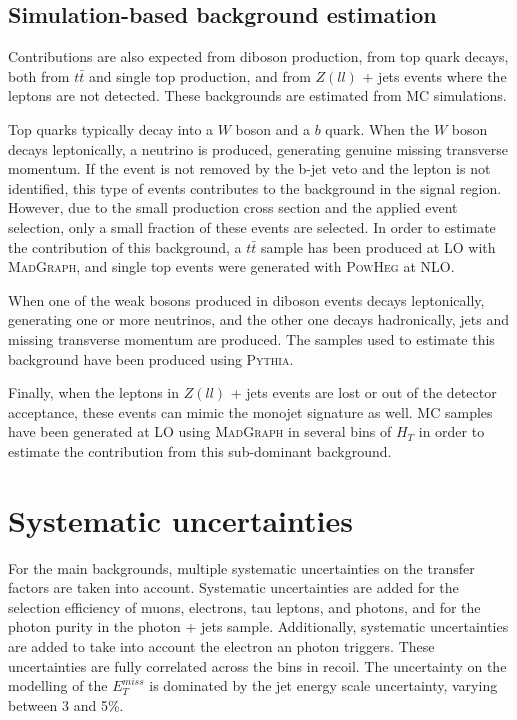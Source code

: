 \subsection{Simulation-based background estimation}

Contributions are also expected from diboson production, from top quark decays, both from $t\bar{t}$ and single top production, and from $Z(ll)$ + jets events where the leptons are not detected. These backgrounds are estimated from MC simulations. 

Top quarks typically decay into a $W$ boson and a $b$ quark. When the $W$ boson decays leptonically, a neutrino is produced, generating genuine missing transverse momentum. If the event is not removed by the b-jet veto and the lepton is not identified, this type of events contributes to the background in the signal region. However, due to the small production cross section and the applied event selection, only a small fraction of these events are selected. In order to estimate the contribution of this background, a $t\bar{t}$ sample has been produced at \ac{LO} with \textsc{MadGraph}, and single top events were generated with \textsc{PowHeg} at \ac{NLO}.

When one of the weak bosons produced in diboson events decays leptonically, generating one or more neutrinos, and the other one decays hadronically, jets and missing transverse momentum are produced. The samples used to estimate this background have been produced using \textsc{Pythia}.

Finally, when the leptons in $Z(ll)$ + jets events are lost or out of the detector acceptance, these events can mimic the monojet signature as well. MC samples have been generated at \ac{LO} using \textsc{MadGraph} in several bins of $H_T$ in order to estimate the contribution from this sub-dominant background.

\section{Systematic uncertainties}
\label{sec:syst}

For the main backgrounds, multiple systematic uncertainties on the transfer factors are taken into account. Systematic uncertainties are added for the selection efficiency of muons, electrons, tau leptons, and photons, and for the photon purity in the photon + jets sample. Additionally, systematic uncertainties are added to take into account the electron an photon triggers. These uncertainties are fully correlated across the bins in recoil. The uncertainty on the modelling of the $E_T^{miss}$ is dominated by the jet energy scale uncertainty, varying between 3 and 5\%.

